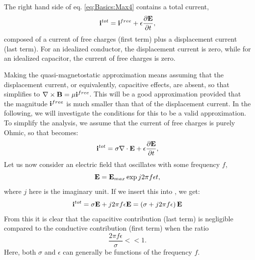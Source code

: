\subsection{}
\label{sec:Basics:Quasimagnetostatic} 
The right hand side of eq. \ref{eq:Basics:Max4} contains a total current,
\begin{equation}
{\bf i}^{tot} = {\bf i}^{free} + \epsilon\frac{\partial {\bf E}}{\partial t}, 
\label{eq:Basics:totcurrent}
\end{equation}
composed of a current of free charges (first term) plus a displacement current (last term). For an idealized conductor, the displacement current is zero, while for an idealized capacitor, the current of free charges is zero. 

Making the quasi-magnetostatic approximation means assuming that the displacement current, or equivalently, capacitive effects, are absent, so that  simplifies to ${\bf \nabla} \times {\bf B}  =  \mu{\bf i}^{free}$. This will be a good approximation provided that the magnitude ${\bf i}^{free}$ is much smaller than that of the displacement current. In the following, we will investigate the conditions for this to be a valid approximation. To simplify the analysis, we assume that the current of free charges is purely Ohmic, so that  becomes:
\begin{equation}
{\bf i}^{tot} = \sigma {\bf \nabla} \cdot {\bf E} + \epsilon\frac{\partial {\bf E}}{\partial t}, 
\label{eq:Basics:totcurrent2}
\end{equation}
Let us now consider an electric field that oscillates with some frequency $f$, 
\begin{equation}
{\bf E} = {\bf E}_{max} \exp{j2\pi f \epsilon t}, 
\label{eq:Basics:Ecomponent}
\end{equation}
where $j$ here is the imaginary unit. If we insert this into , we get:
\begin{equation}
{\bf i}^{tot} = \sigma{\bf E} +  j 2 \pi f \epsilon {\bf E} = \left( \sigma + j 2 \pi f \epsilon \right){\bf E}
\label{eq:Basics:totcurrent3}
\end{equation}
From this it is clear that the capacitive contribution (last term) is negligible compared to the conductive contribution (first term) when the ratio
\begin{equation}
\frac{2 \pi f \epsilon}{\sigma} << 1. 
\label{eq:Basics:ratiocondition}
\end{equation}
Here, both $\sigma$ and $\epsilon$ can generally be functions of the frequency $f$. 


